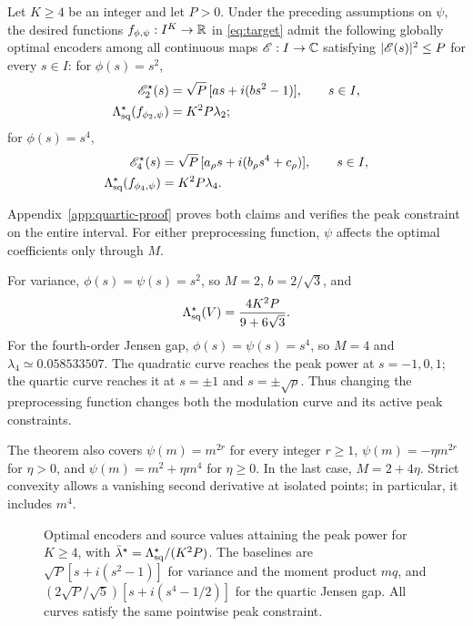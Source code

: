 \begin{theorem}
\label{thm:parabola}\label{thm:quartic}
Let $K\ge4$ be an integer and let $P>0$. Under the preceding assumptions on $\psi$, the desired functions $f_{\phi,\psi}:I^K\to\mathbb R$ in \eqref{eq:target} admit the following globally optimal encoders among all continuous maps $\mathscr E:I\to\mathbb C$ satisfying $|\mathscr E(s)|^2\le P$ for every $s\in I$:
for $\phi(s)=s^2$,
\begin{equation}
\begin{aligned}
 \mathscr E_2^\star(s)&=\sqrt P\,[a s+i(bs^2-1)],\qquad s\in I,\\
 \Lambda_{\mathrm{sq}}^\star(f_{\phi_2,\psi})&=K^2P\lambda_2;
\end{aligned}
 \label{eq:parabola}
\end{equation}
for $\phi(s)=s^4$,
\begin{equation}
\begin{aligned}
 \mathscr E_4^\star(s)&=\sqrt P\,[a_\rho s+i(b_\rho s^4+c_\rho)],\qquad s\in I,\\
 \Lambda_{\mathrm{sq}}^\star(f_{\phi_4,\psi})&=K^2P\lambda_4.
\end{aligned}
 \label{eq:quarticscore}
\end{equation}
\end{theorem}
Appendix~\ref{app:quartic-proof} proves both claims and verifies the peak constraint on the entire interval. For either preprocessing function, $\psi$ affects the optimal coefficients only through $M$.

For variance, $\phi(s)=\psi(s)=s^2$, so $M=2$, $b=2/\sqrt3$, and
$$
 \Lambda_{\mathrm{sq}}^\star(V)=\frac{4K^2P}{9+6\sqrt3}.
$$
For the fourth-order Jensen gap, $\phi(s)=\psi(s)=s^4$, so $M=4$ and $\lambda_4\simeq0.058533507$. The quadratic curve reaches the peak power at $s=-1,0,1$; the quartic curve reaches it at $s=\pm1$ and $s=\pm\sqrt\rho$. Thus changing the preprocessing function changes both the modulation curve and its active peak constraints.

The theorem also covers $\psi(m)=m^{2r}$ for every integer $r\ge1$, $\psi(m)=-\eta m^{2r}$ for $\eta>0$, and $\psi(m)=m^2+\eta m^4$ for $\eta\ge0$. In the last case, $M=2+4\eta$. Strict convexity allows a vanishing second derivative at isolated points; in particular, it includes $m^4$.

\begin{figure}[t]
\centering{}
\caption{Optimal encoders and source values attaining the peak power for $K\ge4$, with $\bar\lambda^\star=\Lambda_{\mathrm{sq}}^\star/(K^2P)$. The baselines are $\sqrt P[s+i(s^2-1)]$ for variance and the moment product $mq$, and $(2\sqrt P/\sqrt5)[s+i(s^4-1/2)]$ for the quartic Jensen gap. All curves satisfy the same pointwise peak constraint.}
\label{fig:curves}\end{figure}

